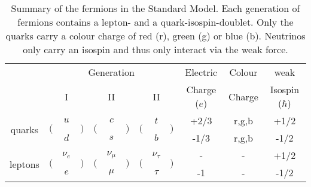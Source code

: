 \begin{table}[]
	\centering
	\caption[Summary of the fermions in the Standard Model]{Summary of the fermions in the Standard Model. Each generation of fermions contains a lepton- and a quark-isospin-doublet. Only the quarks carry a colour charge of red (r), green (g) or blue (b). Neutrinos only carry an isospin and thus only interact via the weak force.}
	\label{tab:theo:fermions}
	\resizebox{\columnwidth}{!}
	{%
	\begin{tabular}{crclrclrclccc}
	\hline
	& \multicolumn{9}{c}{Generation} & Electric & Colour &  weak \\
	& \multicolumn{3}{c}{I} & \multicolumn{3}{c}{II} & \multicolumn{3}{c}{II} & Charge ($e$) & Charge &  Isospin ($\hbar$) \\
	\hline
	\multirow{2}{*}{quarks} & \multirow{2}{*}{$\Big($} & $u$ & \multirow{2}{*}{$\Big)$} & \multirow{2}{*}{$\Big($} & $c$ & \multirow{2}{*}{$\Big)$} & \multirow{2}{*}{$\Big($} & $t$ & \multirow{2}{*}{$\Big)$} & +2/3 & r,g,b & +1/2 \\  
	 & & $d$ & & & $s$ & & & $b$ & & -1/3 & r,g,b & -1/2 \\ 
	\multirow{2}{*}{leptons}& \multirow{2}{*}{$\Big($} & $\nu_e$ & \multirow{2}{*}{$\Big)$} & \multirow{2}{*}{$\Big($} & $\nu_\mu$ & \multirow{2}{*}{$\Big)$} & \multirow{2}{*}{$\Big($} & $\nu_\tau$ & \multirow{2}{*}{$\Big)$} & - & - & +1/2 \\ 
	 & & $e$ & & & $\mu$ & & & $\tau$ & & -1 & - & -1/2 \\
	\hline
	\end{tabular}
	}
\end{table}


